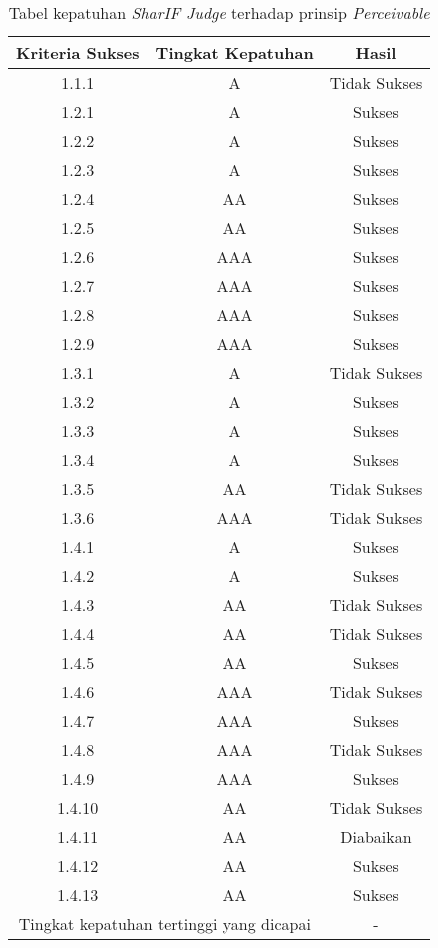 \begin{table}[H]
	\centering
	\caption{Tabel kepatuhan \textit{SharIF Judge} terhadap prinsip \textit{Perceivable}}
	\label{tab:kepatuhan_sharif_judge_perceivable}
	\begin{tabular}{|c|c|c|}
		\hline
		Kriteria Sukses & Tingkat Kepatuhan & Hasil \\
		\hline
		\rowcolor{Pink} 1.1.1 & A & Tidak Sukses\\
		1.2.1 & A & Sukses\\
		1.2.2 & A & Sukses \\
		1.2.3 & A & Sukses \\
		1.2.4 & AA & Sukses \\
		1.2.5 & AA & Sukses \\
		1.2.6 & AAA & Sukses \\
		1.2.7 & AAA & Sukses \\
		1.2.8 & AAA & Sukses \\
		1.2.9 & AAA & Sukses \\
		\rowcolor{Pink} 1.3.1 & A & Tidak Sukses\\
		1.3.2 & A & Sukses \\
		1.3.3 & A & Sukses \\
		1.3.4 & A & Sukses \\
		\rowcolor{LightRed} 1.3.5 & AA & Tidak Sukses\\
		\rowcolor{Red} 1.3.6 & AAA & Tidak Sukses\\
		1.4.1 & A & Sukses \\
		1.4.2 & A & Sukses \\
		\rowcolor{LightRed} 1.4.3 & AA & Tidak Sukses\\
		\rowcolor{LightRed} 1.4.4 & AA & Tidak Sukses\\
		1.4.5 & AA & Sukses\\
		\rowcolor{Red} 1.4.6 & AAA & Tidak Sukses\\
		1.4.7 & AAA & Sukses \\
		\rowcolor{Red} 1.4.8 & AAA & Tidak Sukses\\
		1.4.9 & AAA & Sukses\\
		\rowcolor{LightRed} 1.4.10 & AA & Tidak Sukses\\
		\rowcolor{Gray} 1.4.11 & AA & Diabaikan\\
		1.4.12 & AA & Sukses\\
		1.4.13 & AA & Sukses\\
		\hline
		\multicolumn{2}{|c|}{Tingkat kepatuhan tertinggi yang dicapai} & - \\
		\hline
	\end{tabular}
\end{table}

